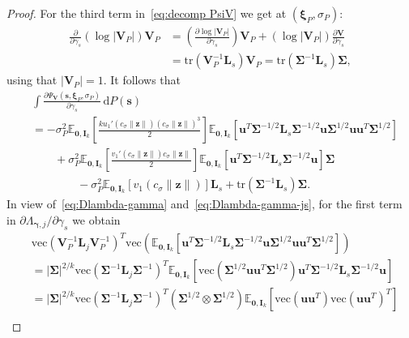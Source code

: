 \documentclass[10pt,a4paper]{amsart}
\newcommand{\E}{\mathbb{E}}
\newcommand{\bI}{\mathbf{I}}
\newcommand{\bL}{\mathbf{L}}
\newcommand{\bSigma}{\mathbf{\Sigma}}
\newcommand{\bV}{\mathbf{V}}
\newcommand{\bgamma}{\bm\gamma}
\newcommand{\bs}{\mathbf{s}}
\newcommand{\bu}{\mathbf{u}}
\newcommand{\bxi}{\bm\xi}
\newcommand{\bz}{\mathbf{z}}
\newcommand{\dd}{\mathrm{d}}
\newcommand{\vc}{\mathrm{vec}}
\begin{document}
\begin{proof}
For the third term in~\eqref{eq:decomp PsiV} we get at $(\bxi_P,\sigma_P)$:
\begin{equation}
\label{eq:term3 decomp PsiV}
\begin{split}
\frac{\partial}{\partial\gamma_s}
(\log|\bV_P|)\mathbf{V}_P
&=
\left(
\frac{\partial\log|\bV_P|}{\partial\gamma_s}
\right)
\bV_P
+
\left(
\log|\bV_P|
\right)
\frac{\partial\bV}{\partial\gamma_s}\\
&=
\text{tr}
\left(
\bV_P^{-1}\bL_s
\right)
\bV_P
=
\text{tr}
\left(
\bSigma^{-1}\bL_s
\right)
\bSigma,
\end{split}
\end{equation}
using that $|\bV_P|=1$.
It follows that 
\begin{equation}
\label{eq:Dlambda-gamma-js}
\begin{split}
&
\int
\frac{\partial\Psi_{\bV}(\bs,\bxi_P,\sigma_P)}{\partial \gamma_s}
\,\dd P(\bs)\\
&=
-
\sigma_P^2
\E_{\mathbf{0},\bI_k}
\left[
\frac{ku_1'\left(c_\sigma\|\bz\|\right)(c_\sigma\|\bz\|)^3}{2}
\right]
\E_{\mathbf{0},\bI_k}
\left[
\bu^T\bSigma^{-1/2}\bL_s\bSigma^{-1/2}\bu
\bSigma^{1/2}\bu\bu^T\bSigma^{1/2}
\right]\\
&\qquad+
\sigma_P^2
\E_{\mathbf{0},\bI_k}
\left[
\frac{v_1'\left(c_\sigma\|\bz\|\right)c_\sigma\|\bz\|}{2}
\right]
\E_{\mathbf{0},\bI_k}
\left[
\bu^T\bSigma^{-1/2}\bL_s\bSigma^{-1/2}\bu
\right]
\bSigma\\
&\qquad\qquad-
\sigma_P^2
\E_{\mathbf{0},\bI_k}
\left[
v_1\left(c_\sigma\|\bz\|\right)
\right]
\bL_s
+
\text{tr}
\left(
\bSigma^{-1}\bL_s
\right)
\bSigma.
\end{split}
\end{equation}
In view of~\eqref{eq:Dlambda-gamma} and~\eqref{eq:Dlambda-gamma-js}, for the first term in $\partial\Lambda_{\bgamma,j}/\partial\gamma_s$
we obtain
\[
\begin{split}
&
\vc(\bV_P^{-1}\bL_j\bV_P^{-1})^T
\vc\left(
\E_{\mathbf{0},\bI_k}
\left[
\bu^T\bSigma^{-1/2}\bL_s\bSigma^{-1/2}\bu
\bSigma^{1/2}\bu\bu^T\bSigma^{1/2}
\right]
\right)\\
&=
|\bSigma|^{2/k}
\vc(\bSigma^{-1}\bL_j\bSigma^{-1})^T
\E_{\mathbf{0},\bI_k}
\left[
\vc\left(
\bSigma^{1/2}\bu\bu^T\bSigma^{1/2}
\right)
\bu^T\bSigma^{-1/2}\bL_s\bSigma^{-1/2}\bu
\right]\\
&=
|\bSigma|^{2/k}
\vc(\bSigma^{-1}\bL_j\bSigma^{-1})^T
(\bSigma^{1/2}\otimes\bSigma^{1/2})
\E_{\mathbf{0},\bI_k}
\left[
\vc\left(
\bu\bu^T
\right)
\vc(\bu\bu^T)^T
\right]\\

\end{split}\]
\end{proof}
\end{document}
